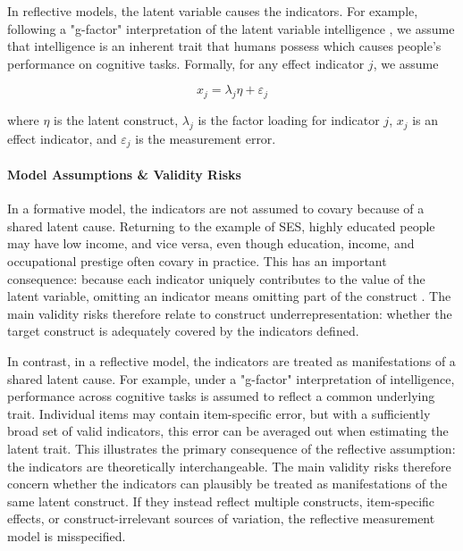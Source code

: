 In reflective models, the latent variable causes the indicators. For example, following a "g-factor" interpretation of the latent variable intelligence \citep{spearman1961general}, we assume that intelligence is an inherent trait that humans possess which causes people's performance on cognitive tasks. Formally, for any effect indicator $j$, we assume

\begin{equation}\label{eq:reflective_model}
    x_j = \lambda_j \eta + \varepsilon_j
\end{equation}

where $\eta$ is the latent construct, $\lambda_j$ is the factor loading for indicator $j$, $x_j$ is an effect indicator, and $\varepsilon_j$ is the measurement error.


\paragraph{Model Assumptions \& Validity Risks}

In a formative model, the indicators are not assumed to covary because of a shared latent cause. Returning to the example of SES, highly educated people may have low income, and vice versa, even though education, income, and occupational prestige often covary in practice. This has an important consequence: because each indicator uniquely contributes to the value of the latent variable, omitting an indicator means omitting part of the construct \citep{bollen1991conventional}. The main validity risks therefore relate to construct underrepresentation: whether the target construct is adequately covered by the indicators defined.

In contrast, in a reflective model, the indicators are treated as manifestations of a shared latent cause. For example, under a "g-factor" interpretation of intelligence, performance across cognitive tasks is assumed to reflect a common underlying trait. Individual items may contain item-specific error, but with a sufficiently broad set of valid indicators, this error can be averaged out when estimating the latent trait. This illustrates the primary consequence of the reflective assumption: the indicators are theoretically interchangeable. The main validity risks therefore concern whether the indicators can plausibly be treated as manifestations of the same latent construct. If they instead reflect multiple constructs, item-specific effects, or construct-irrelevant sources of variation, the reflective measurement model is misspecified.


